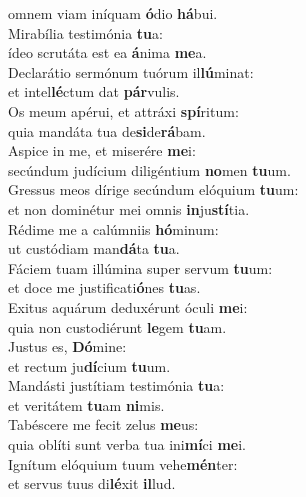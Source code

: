 \evenverse omnem viam iníquam \textbf{ó}dio \textbf{há}bui.\\
\oddverse Mirabília testimónia \textbf{tu}a:~\*\\
\oddverse ídeo scrutáta est ea \textbf{á}nima \textbf{me}a.\\
\evenverse Declarátio sermónum tuórum il\textbf{lú}minat:~\*\\
\evenverse et intel\textbf{lé}ctum dat \textbf{pár}vulis.\\
\oddverse Os meum apérui, et attráxi \textbf{spí}ritum:~\*\\
\oddverse quia mandáta tua de\textbf{si}de\textbf{rá}bam.\\
\evenverse Aspice in me, et miserére \textbf{me}i:~\*\\
\evenverse secúndum judícium diligéntium \textbf{no}men \textbf{tu}um.\\
\oddverse Gressus meos dírige secúndum elóquium \textbf{tu}um:~\*\\
\oddverse et non dominétur mei omnis \textbf{in}ju\textbf{stí}tia.\\
\evenverse Rédime me a calúmniis \textbf{hó}minum:~\*\\
\evenverse ut custódiam man\textbf{dá}ta \textbf{tu}a.\\
\oddverse Fáciem tuam illúmina super servum \textbf{tu}um:~\*\\
\oddverse et doce me justificati\textbf{ó}nes \textbf{tu}as.\\
\evenverse Exitus aquárum deduxérunt óculi \textbf{me}i:~\*\\
\evenverse quia non custodiérunt \textbf{le}gem \textbf{tu}am.\\
\oddverse Justus es, \textbf{Dó}mine:~\*\\
\oddverse et rectum ju\textbf{dí}cium \textbf{tu}um.\\
\evenverse Mandásti justítiam testimónia \textbf{tu}a:~\*\\
\evenverse et veritátem \textbf{tu}am \textbf{ni}mis.\\
\oddverse Tabéscere me fecit zelus \textbf{me}us:~\*\\
\oddverse quia oblíti sunt verba tua ini\textbf{mí}ci \textbf{me}i.\\
\evenverse Ignítum elóquium tuum vehe\textbf{mén}ter:~\*\\
\evenverse et servus tuus di\textbf{lé}xit \textbf{il}lud.\\
